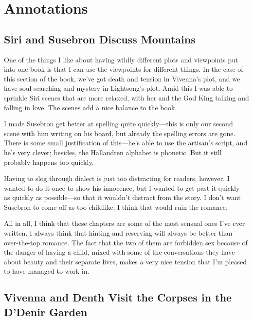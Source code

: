 \section*{Annotations}

\subsection*{Siri and Susebron Discuss Mountains}

One of the things I like about having wildly different plots and viewpoints put into one book is that I can use the viewpoints for different things. In the case of this section of the book, we’ve got death and tension in Vivenna’s plot, and we have soul-searching and mystery in Lightsong’s plot. Amid this I was able to sprinkle Siri scenes that are more relaxed, with her and the God King talking and falling in love. The scenes add a nice balance to the book.

I made Susebron get better at spelling quite quickly—this is only our second scene with him writing on his board, but already the spelling errors are gone. There is some small justification of this—he’s able to use the artisan’s script, and he’s very clever; besides, the Hallandren alphabet is phonetic. But it still probably happens too quickly.

Having to slog through dialect is just too distracting for readers, however. I wanted to do it once to show his innocence, but I wanted to get past it quickly—as quickly as possible—so that it wouldn’t distract from the story. I don’t want Susebron to come off as too childlike; I think that would ruin the romance.

All in all, I think that these chapters are some of the most sensual ones I’ve ever written. I always think that hinting and reserving will always be better than over-the-top romance. The fact that the two of them are forbidden sex because of the danger of having a child, mixed with some of the conversations they have about beauty and their separate lives, makes a very nice tension that I’m pleased to have managed to work in.

\subsection*{Vivenna and Denth Visit the Corpses in the D’Denir Garden}


